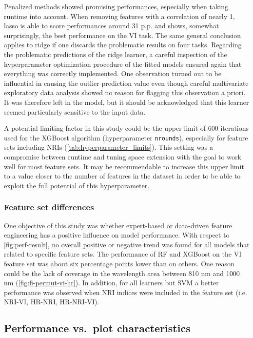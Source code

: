 \documentclass[letterpaper, peerreview, draftcls]{IEEEtran}
\begin{document}
Penalized methods showed promising performances, especially when taking runtime into account.
When removing features with a correlation of nearly 1, lasso is able to score performances around 31 p.p. and shows, somewhat surprisingly, the best performance on the VI task.
The same general conclusion applies to ridge if one discards the problematic results on four tasks.
Regarding the problematic predictions of the ridge learner, a careful inspection of the hyperparameter optimization procedure of the fitted models ensured again that everything was correctly implemented.
One observation turned out to be influential in causing the outlier prediction value even though careful multivariate exploratory data analysis showed no reason for flagging this observation a priori.
It was therefore left in the model, but it should be acknowledged that this learner seemed particularly sensitive to the input data.

A potential limiting factor in this study could be the upper limit of 600 iterations used for the XGBoost algorithm (hyperparameter \texttt{nrounds}), especially for feature sets including NRIs (\autoref{tab:hyperparameter_limits}).
This setting was a compromise between runtime and tuning space extension with the goal to work well for most feature sets.
It may be recommendable to increase this upper limit to a value closer to the number of features in the dataset in order to be able to exploit the full potential of this hyperparameter.

\subsubsection{Feature set differences}

One objective of this study was whether expert-based or data-driven feature engineering has a positive influence on model performance.
With respect to \autoref{fig:perf-result}, no overall positive or negative trend was found for all models that related to specific feature sets.
The performance of RF and XGBoost on the VI feature set was about six percentage points lower than on others.
One reason could be the lack of coverage in the wavelength area between 810 nm and 1000 nm (\autoref{fig:fi-permut-vi-hr}).
In addition, for all learners but SVM a better performance was observed when NRI indices were included in the feature set (i.e. NRI-VI, HR-NRI, HR-NRI-VI).

\subsection{Performance vs.\ plot characteristics}
\label{subsec:perf-plot-char}
\end{document}
